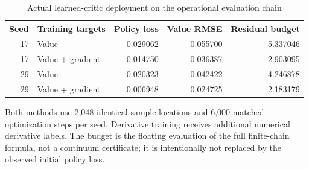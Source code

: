 \begin{table}[htbp]
\centering
\caption{Actual learned-critic deployment on the operational evaluation chain}\label{tab:r6learning}
\small
\begin{tabular}{rlrrr}
\toprule
Seed & Training targets & Policy loss & Value RMSE & Residual budget \\
\midrule
17 & Value & 0.029062 & 0.055700 & 5.337046 \\
17 & Value + gradient & 0.014750 & 0.036387 & 2.903095 \\
29 & Value & 0.020323 & 0.042422 & 4.246878 \\
29 & Value + gradient & 0.006948 & 0.024725 & 2.183179 \\
\bottomrule
\end{tabular}
\par\smallskip\begin{minipage}{0.96\textwidth}\footnotesize Both methods use 2,048 identical sample locations and 6,000 matched optimization steps per seed. Derivative training receives additional numerical derivative labels. The budget is the floating evaluation of the full finite-chain formula, not a continuum certificate; it is intentionally not replaced by the observed initial policy loss.\end{minipage}
\end{table}
